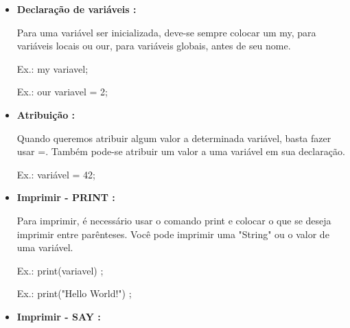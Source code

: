 \documentclass[a4paper]{article}
\begin{document}
{{{{{\begin{itemize}
            \textcolor{NavyBlue}{Ex.:}
            
            // Esse é o comentário!
       
       \bigskip
       
        \item \textbf{Declaração de variáveis :}
        
            Para uma variável ser inicializada, deve-se
            sempre colocar um 
            \textcolor{NavyBlue}{my},
            para variáveis locais ou 
            \textcolor{NavyBlue}{our},
            para variáveis globais,
            antes de seu nome.
            
            \textcolor{NavyBlue}{Ex.:}
            \textcolor{NavyBlue}{my} 
            variavel;
        
            \textcolor{NavyBlue}{Ex.:} 
            \textcolor{NavyBlue}{our} variavel = 2;  
        
        \bigskip
        
        \item \textbf{Atribuição :}
        
            Quando queremos atribuir algum valor a
            determinada variável, basta fazer usar 
            \textcolor{NavyBlue}{=}.
            Também pode-se atribuir um valor a uma
            variável em sua declaração.
            
            \textcolor{NavyBlue}{Ex.:}
            variável 
            \textcolor{NavyBlue}{=}
            42;
            
        \bigskip
        
        \item \textbf{Imprimir - PRINT : }
        
            Para imprimir, é necessário usar o
            comando 
            \textcolor{NavyBlue}{print} e
            colocar o que se deseja imprimir entre
            parênteses.
            Você pode imprimir uma "String" ou o 
            valor de uma variável.
            
            \textcolor{NavyBlue}{Ex.:}
            \textcolor{NavyBlue}{print(variavel)}
            ;
            
            \textcolor{NavyBlue}{Ex.:}
            \textcolor{NavyBlue}{print("Hello World!")}
            ;
       
       \bigskip
            
       \item \textbf{Imprimir - SAY : }
        

\end{itemize}}}}}}
\end{document}
